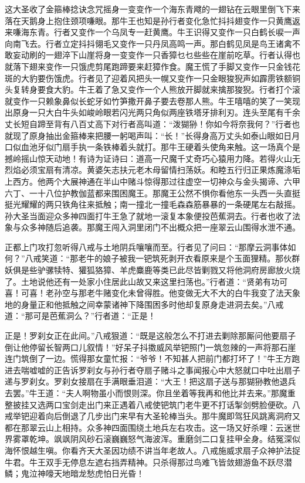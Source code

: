 \documentclass[12pt,UTF8]{ctexbook}
\begin{document}
这大圣收了金箍棒捻诀念咒摇身一变变作一个海东青飕的一翅钻在云眼里倒飞下来落在天鹅身上抱住颈项嗛眼。那牛王也知是孙行者变化急忙抖抖翅变作一只黄鹰返来嗛海东青。行者又变作一个乌凤专一赶黄鹰。牛王识得又变作一只白鹤长唳一声向南飞去。行者立定抖抖翎毛又变作一只丹凤高鸣一声。那白鹤见凤是鸟王诸禽不敢妄动刷的一翅淬下山崖将身一变变作一只香獐乜乜些些在崖前吃草。行者认得也就落下翅来变作一只饿虎剪尾跑蹄要来赶獐作食。魔王慌了手脚又变作一只金钱花斑的大豹要伤饿虎。行者见了迎着风把头一幌又变作一只金眼狻猊声如霹雳铁额铜头复转身要食大豹。牛王着了急又变作一个人熊放开脚就来擒那狻猊。行者打个滚就变作一只赖象鼻似长蛇牙如竹笋撒开鼻子要去卷那人熊。牛王嘻嘻的笑了一笑现出原身一只大白牛头如峻岭眼若闪光两只角似两座铁塔牙排利刃。连头至尾有千余丈长短自蹄至背有八百丈高下对行者高叫道：“泼猢狲！你如今将奈我何？”行者也就现了原身抽出金箍棒来把腰一躬喝声叫：“长！”长得身高万丈头如泰山眼如日月口似血池牙似门扇手执一条铁棒着头就打。那牛王硬着头使角来触。这一场真个是撼岭摇山惊天动地！有诗为证诗曰：道高一尺魔千丈奇巧心猿用力降。若得火山无烈焰必须宝扇有清凉。黄婆矢志扶元老木母留情扫荡妖。和睦五行归正果炼魔涤垢上西方。他两个大展神通在半山中赌斗惊得那过往虚空一切神众与金头揭谛、六甲六丁、一十八位护教伽蓝都来围困魔王。那魔王公然不惧你看他东一头西一头直挺挺光耀耀的两只铁角往来抵触；南一撞北一撞毛森森筋暴暴的一条硬尾左右敲摇。孙大圣当面迎众多神四面打牛王急了就地一滚复本象便投芭蕉洞去。行者也收了法象与众多神随后追袭。那魔王闯入洞里闭门不出概众把一座翠云山围得水泄不通。

正都上门攻打忽听得八戒与土地阴兵嚷嚷而至。行者见了问曰：“那摩云洞事体如何？”八戒笑道：“那老牛的娘子被我一钯筑死剥开衣看原来是个玉面狸精。那伙群妖俱是些驴骡犊特、獾狐狢獐、羊虎麋鹿等类已此尽皆剿戮又将他洞府房廊放火烧了。土地说他还有一处家小住居此山故又来这里扫荡也。”行者道：“贤弟有功可喜！可喜！老孙空与那老牛赌变化未曾得胜。他变做无大不大的白牛我变了法天象地的身量正和他抵触之间幸蒙诸神下降围困多时他却复原身走进洞去矣。”八戒道：“那可是芭蕉洞么？”行者道：“正是！

正是！罗刹女正在此间。”八戒狠道：“既是这般怎么不打进去剿除那厮问他要扇子倒让他停留长智两口儿叙情！”好呆子抖擞威风举钯照门一筑忽辣的一声将那石崖连门筑倒了一边。慌得那女童忙报：“爷爷！不知甚人把前门都打坏了！”牛王方跑进去喘嘘嘘的正告诉罗刹女与孙行者夺扇子赌斗之事闻报心中大怒就口中吐出扇子递与罗刹女。罗刹女接扇在手满眼垂泪道：“大王！把这扇子送与那猢狲教他退兵去罢。”牛王道：“夫人啊物虽小而恨则深。你且坐着等我再和他比并去来。”那魔重整披挂又选两口宝剑走出门来正遇着八戒使钯筑门老牛更不打话掣剑劈脸便砍。八戒举钯迎着向后倒退了几步出门来早有大圣轮棒当头。那牛魔即驾狂风跳离洞府又都在那翠云山上相持。众多神四面围绕土地兵左右攻击。这一场又好杀哩：云迷世界雾罩乾坤。飒飒阴风砂石滚巍巍怒气海波浑。重磨剑二口复挂甲全身。结冤深似海怀恨越生嗔。你看齐天大圣因功绩不讲当年老故人。八戒施威求扇子众神护法捉牛君。牛王双手无停息左遮右挡弄精神。只杀得那过鸟难飞皆敛翅游鱼不跃尽潜鳞；鬼泣神嚎天地暗龙愁虎怕日光昏！
\end{document}
